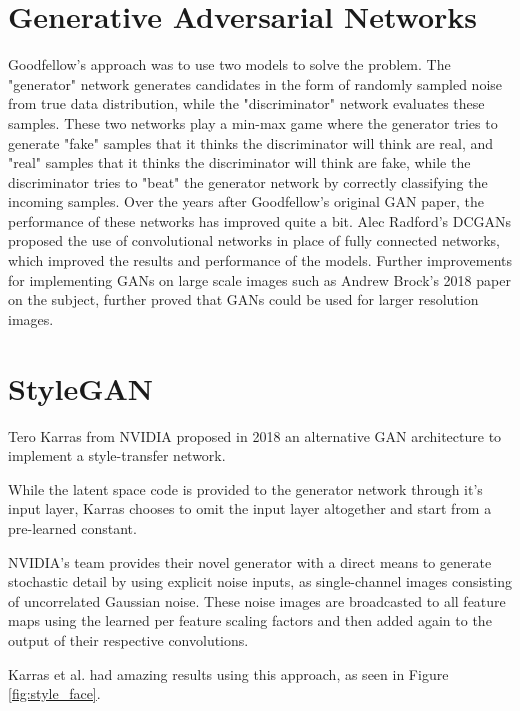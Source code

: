 \documentclass[journal,onecolumn]{IEEEtran}
\begin{document}
\section{Generative Adversarial Networks}
Goodfellow's approach was to use two models to solve the problem. The "generator" network generates candidates in the form of randomly sampled noise from true data distribution, while the "discriminator" network evaluates these samples. These two networks play a min-max game where the generator tries to generate "fake" samples that it thinks the discriminator will think are real, and "real" samples that it thinks the discriminator will think are fake, while the discriminator tries to "beat" the generator network by correctly classifying the incoming samples.
Over the years after Goodfellow's original GAN paper, the performance of these networks has improved quite a bit. Alec Radford's DCGANs\cite{radford_metz_chintala_2015} proposed the use of convolutional networks in place of fully connected networks, which improved the results and performance of the models. Further improvements for implementing GANs on large scale images such as Andrew Brock's 2018 \cite{DBLP:journals/corr/abs-1809-11096} paper on the subject, further proved that GANs could be used for larger resolution images.

\section{StyleGAN}

Tero Karras from NVIDIA proposed in 2018 an alternative GAN architecture to implement a style-transfer network.\cite{DBLP:journals/corr/abs-1912-04958} 

While the latent space code is provided to the generator network through it's input layer, Karras chooses to omit the input layer altogether and start from a pre-learned constant. 

NVIDIA's team provides their novel generator with a direct means to generate stochastic detail by using explicit noise inputs, as single-channel images consisting of uncorrelated Gaussian noise. These noise images are broadcasted to all feature maps using the learned per feature scaling factors and then added again to the output of their respective convolutions. 

Karras et al. had amazing results using this approach, as seen in Figure \ref{fig:style_face}.
\end{document}

